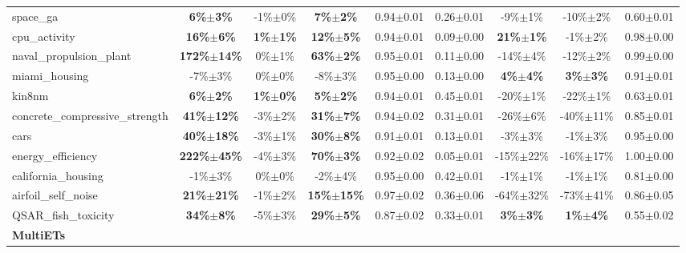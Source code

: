 \begin{table}[t]
\begin{small}
\begin{sc}
{\begin{tabular}{lcccccccc}
space\_ga  &  \textbf{6\%$\pm$3\%}  &  -1\%$\pm$0\%  &  \textbf{7\%$\pm$2\%}  &  0.94$\pm$0.01  &  0.26$\pm$0.01  &  -9\%$\pm$1\%  &  -10\%$\pm$2\%  &  0.60$\pm$0.01 \\
cpu\_activity  &  \textbf{16\%$\pm$6\%}  &  \textbf{1\%$\pm$1\%}  &  \textbf{12\%$\pm$5\%}  &  0.94$\pm$0.01  &  0.09$\pm$0.00  &  \textbf{21\%$\pm$1\%}  &  -1\%$\pm$2\%  &  0.98$\pm$0.00 \\
naval\_propulsion\_plant  &  \textbf{172\%$\pm$14\%}  &  0\%$\pm$1\%  &  \textbf{63\%$\pm$2\%}  &  0.95$\pm$0.01  &  0.11$\pm$0.00  &  -14\%$\pm$4\%  &  -12\%$\pm$2\%  &  0.99$\pm$0.00 \\
miami\_housing  &  -7\%$\pm$3\%  &  0\%$\pm$0\%  &  -8\%$\pm$3\%  &  0.95$\pm$0.00  &  0.13$\pm$0.00  &  \textbf{4\%$\pm$4\%}  &  \textbf{3\%$\pm$3\%}  &  0.91$\pm$0.01 \\
kin8nm  &  \textbf{6\%$\pm$2\%}  &  \textbf{1\%$\pm$0\%}  &  \textbf{5\%$\pm$2\%}  &  0.94$\pm$0.01  &  0.45$\pm$0.01  &  -20\%$\pm$1\%  &  -22\%$\pm$1\%  &  0.63$\pm$0.01 \\
concrete\_compressive\_strength  &  \textbf{41\%$\pm$12\%}  &  -3\%$\pm$2\%  &  \textbf{31\%$\pm$7\%}  &  0.94$\pm$0.02  &  0.31$\pm$0.01  &  -26\%$\pm$6\%  &  -40\%$\pm$11\%  &  0.85$\pm$0.01 \\
cars  &  \textbf{40\%$\pm$18\%}  &  -3\%$\pm$1\%  &  \textbf{30\%$\pm$8\%}  &  0.91$\pm$0.01  &  0.13$\pm$0.01  &  -3\%$\pm$3\%  &  -1\%$\pm$3\%  &  0.95$\pm$0.00 \\
energy\_efficiency  &  \textbf{222\%$\pm$45\%}  &  -4\%$\pm$3\%  &  \textbf{70\%$\pm$3\%}  &  0.92$\pm$0.02  &  0.05$\pm$0.01  &  -15\%$\pm$22\%  &  -16\%$\pm$17\%  &  1.00$\pm$0.00 \\
california\_housing  &  -1\%$\pm$3\%  &  0\%$\pm$0\%  &  -2\%$\pm$4\%  &  0.95$\pm$0.00  &  0.42$\pm$0.01  &  -1\%$\pm$1\%  &  -1\%$\pm$1\%  &  0.81$\pm$0.00 \\
airfoil\_self\_noise  &  \textbf{21\%$\pm$21\%}  &  -1\%$\pm$2\%  &  \textbf{15\%$\pm$15\%}  &  0.97$\pm$0.02  &  0.36$\pm$0.06  &  -64\%$\pm$32\%  &  -73\%$\pm$41\%  &  0.86$\pm$0.05 \\
QSAR\_fish\_toxicity  &  \textbf{34\%$\pm$8\%}  &  -5\%$\pm$3\%  &  \textbf{29\%$\pm$5\%}  &  0.87$\pm$0.02  &  0.33$\pm$0.01  &  \textbf{3\%$\pm$3\%}  &  \textbf{1\%$\pm$4\%}  &  0.55$\pm$0.02 \\
\cmidrule(lr){1-9}
\textbf{MultiETs} & & & & & & & & \\ \cmidrule(lr){1-9}


\end{tabular}}
\end{sc}
\end{small}
\end{table}
